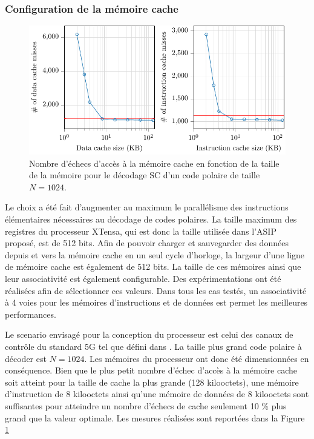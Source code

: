 \subsubsection{Configuration de la mémoire cache}
\begin{figure}
\centering
\includegraphics[width=\textwidth]{main/ch3_fig/curves/memory/tikz/memory}
\caption{Nombre d'échecs d'accès à la mémoire cache en fonction de la taille de la mémoire pour le décodage SC d'un code polaire de taille $N=1024$.}
\label{fig:tensilica_mem}
\end{figure}

Le choix a été fait d'augmenter au maximum le parallélisme des instructions élémentaires nécessaires au décodage de codes polaires. La taille maximum des registres du processeur XTensa, qui est donc la taille utilisée dans l'ASIP proposé, est de 512 bits. Afin de pouvoir charger et sauvegarder des données depuis et vers la mémoire cache en un seul cycle d'horloge, la largeur d'une ligne de mémoire cache est également de 512 bits. La taille de ces mémoires ainsi que leur associativité est également configurable. Des expérimentations ont été réalisées afin de sélectionner ces valeurs. Dans tous les cas testés, un associativité à 4 voies pour les mémoires d'instructions et de données est permet les meilleures performances.

Le scenario envisagé pour la conception du processeur est celui des canaux de contrôle du standard 5G tel que défini dans \cite{3gpp_ts_2017}. La taille plus grand code polaire à décoder est $N=1024$. Les mémoires du processeur ont donc été dimensionnées en conséquence.
Bien que le plus petit nombre d'échec d'accès à la mémoire cache soit atteint pour la taille de cache la plus grande (128 kilooctets), une mémoire d'instruction de 8 kilooctets ainsi qu'une mémoire de données de 8 kilooctets sont suffisantes pour atteindre un nombre d'échecs de cache seulement 10 \% plus grand que la valeur optimale. Les mesures réalisées sont reportées dans la Figure \ref{fig:tensilica_mem}

